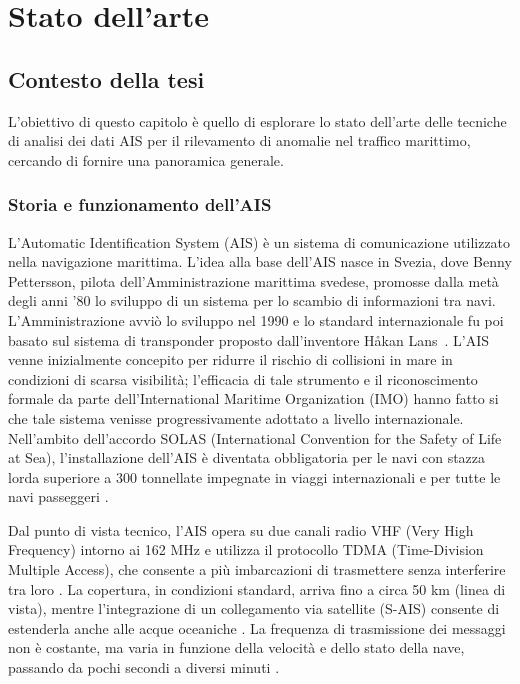 \chapter{Stato dell'arte}
\label{chap:literature}

\section{Contesto della tesi}
\label{sec:contesto}


L’obiettivo di questo capitolo è quello di esplorare lo stato dell’arte delle tecniche 
di analisi dei dati AIS per il rilevamento di anomalie nel traffico marittimo, 
cercando di fornire una panoramica generale.

\subsection{Storia e funzionamento dell'AIS}

L’Automatic Identification System (AIS) è un sistema di comunicazione utilizzato nella navigazione marittima. 
L'idea alla base dell'AIS nasce in Svezia, dove Benny Pettersson, pilota dell'Amministrazione marittima svedese,
promosse dalla metà degli anni '80 lo sviluppo di un sistema per lo scambio di informazioni tra navi.
L'Amministrazione avviò lo sviluppo nel 1990 e lo standard internazionale fu poi basato sul sistema di transponder
proposto dall'inventore Håkan Lans~\cite{gardebring2018}.
L'AIS venne inizialmente concepito per ridurre il rischio di collisioni in mare in condizioni di scarsa visibilità;
l'efficacia di tale strumento e il riconoscimento formale da parte dell'International Maritime Organization (IMO) hanno 
fatto si che tale sistema venisse progressivamente adottato a livello internazionale.
Nell’ambito dell’accordo SOLAS (International Convention for the Safety of Life at Sea), l’installazione dell’AIS è diventata obbligatoria per le navi con 
stazza lorda superiore a 300 tonnellate impegnate in viaggi internazionali e per tutte le navi passeggeri 
\cite{imo2004}.

Dal punto di vista tecnico, l’AIS opera su due canali radio VHF (Very High Frequency) intorno ai 162 MHz 
e utilizza il protocollo TDMA (Time-Division Multiple Access), 
che consente a più imbarcazioni di trasmettere senza interferire tra loro \cite{riassuntone}. 
La copertura, in condizioni standard, arriva fino a circa 50 km (linea di vista), 
mentre l’integrazione di un collegamento via satellite (S-AIS) consente di estenderla anche alle acque oceaniche \cite{riassuntone}.
 La frequenza di trasmissione dei messaggi non è costante, ma varia in funzione della velocità e dello stato 
 della nave, passando da pochi secondi a diversi minuti \cite{riassuntone}.

